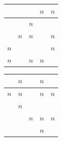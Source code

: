 \documentclass[11pt]{scrartcl}
\begin{document}
\begin{soaljawab}
\begin{solusi}
        \begin{center}
        \begin{tabular}{ |c|c|c|c|c| }
        \hline
        &  &  &  $n$ & $n$ \\
        \hline
        &  & $n$ &  &  \\
        \hline
        &  $n$ &  $n$ &  & $n$ \\
        \hline
        $n$ &  &  & & $n$ \\
        \hline
        $n$ &  & $n$ & $n$ &  \\
        \hline
        \end{tabular}
        \quad
        \begin{tabular}{ |c|c|c|c|c| }
        \hline
        & $n$ &  & $n$ &  \\
        \hline
        $n$ & $n$ &  & $n$ & $n$\\
        \hline
        & $n$ & & & \\
        \hline
        & &$n$ & $n$& $n$ \\
        \hline
        & &  & $n$ & \\
        \hline
        \end{tabular}
        \end{center}
    \end{solusi}
\end{soaljawab}
\end{document}
